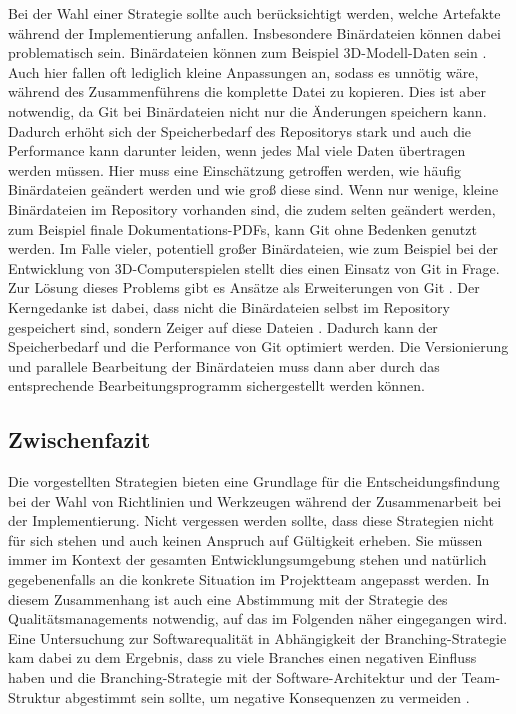 Bei der Wahl einer Strategie sollte auch berücksichtigt werden, welche Artefakte während der Implementierung anfallen. Insbesondere Binärdateien können dabei problematisch sein. Binärdateien können zum Beispiel 3D-Modell-Daten sein \cite{Community:2022:Blender:13}. Auch hier fallen oft lediglich kleine Anpassungen an, sodass es unnötig wäre, während des Zusammenführens die komplette Datei zu kopieren. Dies ist aber notwendig, da Git bei Binärdateien nicht nur die Änderungen speichern kann. Dadurch erhöht sich der Speicherbedarf des Repositorys stark und auch die Performance kann darunter leiden, wenn jedes Mal viele Daten übertragen werden müssen. Hier muss eine Einschätzung getroffen werden, wie häufig Binärdateien geändert werden und wie groß diese sind. Wenn nur wenige, kleine Binärdateien im Repository vorhanden sind, die zudem selten geändert werden, zum Beispiel finale Dokumentations-PDFs, kann Git ohne Bedenken genutzt werden. Im Falle vieler, potentiell großer Binärdateien, wie zum Beispiel bei der Entwicklung von 3D-Computerspielen stellt dies einen Einsatz von Git in Frage. Zur Lösung dieses Problems gibt es Ansätze als Erweiterungen von Git \cite{Kenlon:2016:Hot-to-manage:74}. Der Kerngedanke ist dabei, dass nicht die Binärdateien selbst im Repository gespeichert sind, sondern Zeiger auf diese Dateien \cite{Gehman:2019:How-Git-LFS-Works::74}. Dadurch kann der Speicherbedarf und die Performance von Git optimiert werden. Die Versionierung und parallele Bearbeitung der Binärdateien muss dann aber durch das entsprechende Bearbeitungsprogramm sichergestellt werden können.

\subsection{Zwischenfazit}

Die vorgestellten Strategien bieten eine Grundlage für die Entscheidungsfindung bei der Wahl von Richtlinien und Werkzeugen während der Zusammenarbeit bei der Implementierung. Nicht vergessen werden sollte, dass diese Strategien nicht für sich stehen und auch keinen Anspruch auf Gültigkeit erheben. Sie müssen immer im Kontext der gesamten Entwicklungsumgebung stehen und natürlich gegebenenfalls an die konkrete Situation im Projektteam angepasst werden. In diesem Zusammenhang ist auch eine Abstimmung mit der Strategie des Qualitätsmanagements notwendig, auf das im Folgenden näher eingegangen wird.
Eine Untersuchung zur Softwarequalität in Abhängigkeit der Branching-Strategie kam dabei zu dem Ergebnis, dass zu viele Branches einen negativen Einfluss haben und die Branching-Strategie mit der Software-Architektur und der Team-Struktur abgestimmt sein sollte, um negative Konsequenzen zu vermeiden \cite{Shihab:2012:The-Effect:91}.




